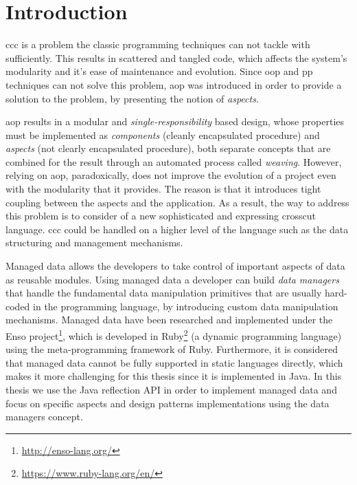 
\chapter{Introduction}\label{Introduction}
\ac{ccc} is a problem the classic programming techniques can not tackle with sufficiently. 
This results in scattered and tangled code, which affects the system's modularity and it's ease of maintenance and evolution. 
Since \ac{oop} and \ac{pp} techniques can not solve this problem, \ac{aop} was introduced \cite{kiczales1997aspect} in order to provide a solution to the problem, by presenting the notion of \textit{aspects}.

\ac{aop} results in a modular and \textit{single-responsibility} based design, whose properties must be implemented as \textit{components} (cleanly encapsulated procedure) and \textit{aspects} (not clearly encapsulated procedure), both separate concepts that are combined for the result through an automated process called \textit{weaving}. 
However, relying on \ac{aop}, paradoxically, does not improve the evolution of a project even with the modularity that it provides. The reason is that it introduces tight coupling between the aspects and the application. 
As a result, the way to address this problem is to consider of a new sophisticated and expressing crosscut language. \ac{ccc} could be handled on a higher level of the language such as the data structuring and management mechanisms.

Managed data \cite{loh2012managed} allows the developers to take control of important aspects of data as reusable modules. 
Using managed data a developer can build \textit{data managers} that handle the fundamental data manipulation primitives 
that are usually hard-coded in the programming language, by introducing custom data manipulation mechanisms. 
Managed data have been researched and implemented under the Enso project\footnote{\label{enso}\url{http://enso-lang.org/}}, which is developed in Ruby\footnote{\label{ruby}\url{https://www.ruby-lang.org/en/}} (a dynamic programming language) using the meta-programming framework of Ruby. 
Furthermore, it is considered\cite{loh2012managed} that managed data cannot be fully supported in static languages directly, which makes it more challenging for this thesis since it is implemented in Java.
In this thesis we use the Java reflection API in order to implement managed data and focus on specific aspects and design patterns implementations using the data managers concept. 

